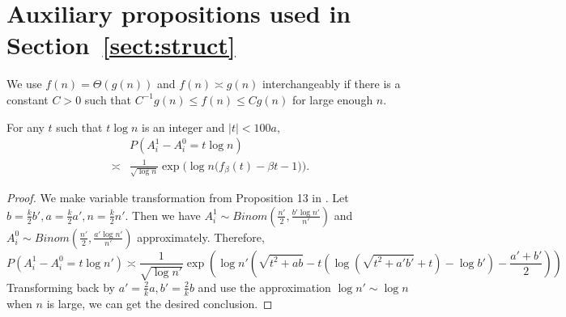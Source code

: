 \documentclass{article}
\begin{document}
\section{Auxiliary propositions used in Section~\ref{sect:struct}}\label{ap:um}




We use $f(n)=\Theta(g(n))$ and $f(n)\asymp g(n)$ interchangeably if there is a constant $C>0$ such that $C^{-1}g(n)\le f(n)\le C g(n)$ for large enough $n$.

\begin{proposition}  \label{prop:99}
For any $t$ such that $t\log n$ is an integer and $|t|<100a$,
\begin{equation} \label{eq:ly}
\begin{aligned}
& P(A^1_i-A^0_i = t\log n)  \\
\asymp & \frac{1} {\sqrt{\log n}} \exp\Big(\log n
\Big(f_{\beta}(t) - \beta t -1 \Big)\Big) .
\end{aligned}
\end{equation}
\end{proposition}


\begin{proof}
We make variable transformation from Proposition 13 in \cite{ye2020exact}.
Let $b = \frac{k}{2}b', a=\frac{k}{2}a', n = \frac{k}{2}n'$.
Then we have $A_i^1 \sim Binom(\frac{n'}{2}, \frac{b' \log n'}{n'})$ and 
$A_i^0 \sim Binom(\frac{n'}{2}, \frac{a' \log n'}{n'})$ approximately.
Therefore, 
$$
P(A_i^1 - A_i^0 = t \log n') \asymp \frac{1}{\sqrt{\log n'}} \exp(\log n'(\sqrt{t^2+ab} - t(\log(\sqrt{t^2+a'b'}+t)-\log b') - \frac{a'+b'}{2}))
$$
Transforming back by $a'=\frac{2}{k}a, b' = \frac{2}{k}b$ and use the approximation $\log n' \sim \log n$ when $n$ is large, we can get the desired
conclusion.
\end{proof}
\end{document}
